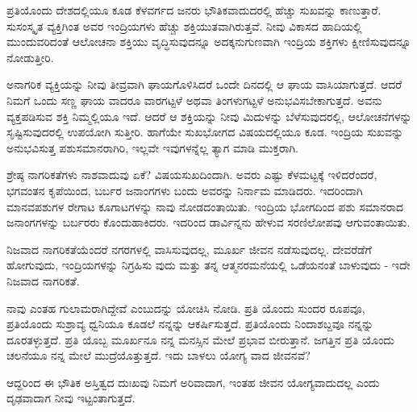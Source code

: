 ಪ್ರತಿಯೊಂದು ದೇಶದಲ್ಲಿಯೂ ಕೂಡ ಕೆಳವರ್ಗದ ಜನರು ಭೌತಿಕವಾದುದರಲ್ಲಿ ಹೆಚ್ಚು ಸುಖವನ್ನು ಕಾಣುತ್ತಾರೆ. ಸುಸಂಸ್ಕೃತ ವ್ಯಕ್ತಿಗಿಂತ ಅವರ ಇಂದ್ರಿಯಗಳು ಹೆಚ್ಚು ಶಕ್ತಿಯುತವಾಗಿರುತ್ತವೆ. ನೀವು ವಿಕಾಸದ ಹಾದಿಯಲ್ಲಿ ಮುಂದುವರಿದಂತೆ ಆಲೋಚನಾ ಶಕ್ತಿಯು ವೃದ್ಧಿಸುವುದನ್ನೂ ಅದಕ್ಕನುಗುಣವಾಗಿ ಇಂದ್ರಿಯ ಶಕ್ತಿಗಳು ಕ್ಷೀಣಿಸುವುದನ್ನೂ ನೋಡುತ್ತೀರಿ.

ಅನಾಗರಿಕ ವ್ಯಕ್ತಿಯನ್ನು ನೀವು ತೀವ್ರವಾಗಿ ಘಾಯಗೊಳಿಸಿದರೆ ಒಂದೇ ದಿನದಲ್ಲಿ ಆ ಘಾಯ ವಾಸಿಯಾಗುತ್ತದೆ. ಆದರೆ ನಿಮಗೆ ಒಂದು ಸಣ್ಣ ಘಾಯ ವಾದರೂ ವಾರಗಟ್ಟಳೆ ಅಥವಾ ತಿಂಗಳುಗಟ್ಟಳೆ ಅನುಭವಿಸಬೇಕಾಗುತ್ತದೆ. ಅವನು ವ್ಯಕ್ತಪಡಿಸುವ ಶಕ್ತಿ ನಿಮ್ಮಲ್ಲಿಯೂ ಇದೆ. ಆದರೆ ಆ ಶಕ್ತಿಯನ್ನು ನೀವು ಮಿದುಳನ್ನು ಬೆಳೆಸುವುದರಲ್ಲಿ, ಆಲೋಚನೆಗಳನ್ನು ಸೃಷ್ಟಿಸುವುದರಲ್ಲಿ ಉಪಯೋಗಿ ಸುತ್ತೀರಿ. ಹಾಗೆಯೇ ಸುಖಭೋಗದ ವಿಷಯದಲ್ಲಿಯೂ ಕೂಡ. ಇಂದ್ರಿಯ ಸುಖವನ್ನು ಅನುಭವಿಸುತ್ತ ಪಶುಸಮಾನರಾಗಿರಿ, ಇಲ್ಲವೇ ಇವುಗಳನ್ನೆಲ್ಲ ತ್ಯಾಗ ಮಾಡಿ ಮುಕ್ತರಾಗಿ.

ಶ್ರೇಷ್ಠ ನಾಗರಿಕತೆಗಳು ನಾಶವಾದುವು ಏಕೆ? ವಿಷಯಸುಖದಿಂದಾಗಿ. ಅವರು ಎಷ್ಟು ಕೆಳಮಟ್ಟಕ್ಕೆ ಇಳಿದರೆಂದರೆ, ಭಗವಂತನ ಕೃಪೆಯಿಂದ, ಬರ್ಬರ ಜನಾಂಗಗಳು ಬಂದು ಅವರನ್ನು ನಿರ್ನಾಮ ಮಾಡಿದರು. ಇದರಿಂದಾಗಿ ಮಾನವಪಶುಗಳ ರೇಗಾಟ ಕೂಗಾಟಗಳನ್ನು ನಾವು ನೋಡದಂತಾಯಿತು. ಇಂದ್ರಿಯ ಭೋಗದಿಂದ ಪಶು ಸಮಾನರಾದ ಜನಾಂಗಗಳನ್ನು ಬರ್ಬರರು ಕೊಂದುಹಾಕಿದರು. ಇದರಿಂದ ಡಾರ್ವಿನ್ನನು ಹೇಳುವ ಸರಣಿಲೋಪವು ಆಗುವಂತಾಯಿತು.

ನಿಜವಾದ ನಾಗರಿಕತೆಯೆಂದರೆ ನಗರಗಳಲ್ಲಿ ವಾಸಿಸುವುದಲ್ಲ, ಮೂರ್ಖ ಜೀವನ ನಡೆಸುವುದಲ್ಲ. ದೇವರೆಡೆಗೆ ಹೋಗುವುದು, ಇಂದ್ರಿಯಗಳನ್ನು ನಿಗ್ರಹಿಸು ವುದು ಮತ್ತು ತನ್ನ ಆತ್ಮನರಮನೆಯಲ್ಲಿ ಒಡೆಯನಂತೆ ಬಾಳುವುದು - ಇದೇ ನಿಜವಾದ ನಾಗರಿಕತೆ.

ನಾವು ಎಂತಹ ಗುಲಾಮರಾಗಿದ್ದೇವೆ ಎಂಬುದನ್ನು ಯೋಚಿಸಿ ನೋಡಿ. ಪ್ರತಿ ಯೊಂದು ಸುಂದರ ರೂಪವೂ, ಪ್ರತಿಯೊಂದು ಸುಶ್ರಾವ್ಯ ಧ್ವನಿಯೂ ಕೂಡಲೆ ನನ್ನನ್ನು ಆಕರ್ಷಿಸುತ್ತದೆ. ಪ್ರತಿಯೊಂದು ನಿಂದಾಶಬ್ದವೂ ನನ್ನನ್ನು ದೂರತಳ್ಳುತ್ತದೆ. ಪ್ರತಿ ಯೊಬ್ಬ ಮೂರ್ಖನೂ ನನ್ನ ಮನಸ್ಸಿನ ಮೇಲೆ ಪ್ರಭಾವ ಬೀರುತ್ತಾನೆ. ಜಗತ್ತಿನ ಪ್ರತಿ ಯೊಂದು ಚಲನೆಯೂ ನನ್ನ ಮೇಲೆ ಮುದ್ರೆಯೊತ್ತುತ್ತದೆ. ಇದು ಬಾಳಲು ಯೋಗ್ಯ ವಾದ ಜೀವನವೆ?

ಆದ್ದರಿಂದ ಈ ಭೌತಿಕ ಅಸ್ತಿತ್ವದ ದುಃಖವು ನಿಮಗೆ ಅರಿವಾದಾಗ, ಇಂತಹ ಜೀವನ ಯೋಗ್ಯವಾದುದಲ್ಲ ಎಂದು ದೃಢವಾದಾಗ ನೀವು ಇಟ್ಟಂತಾಗುತ್ತದೆ.

